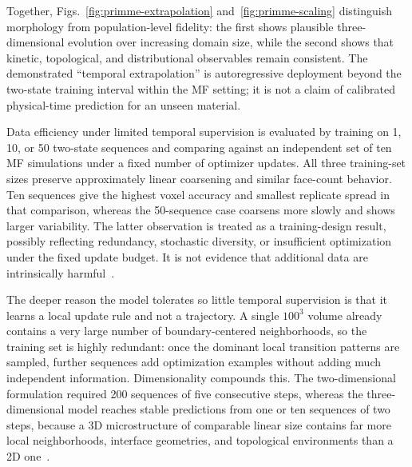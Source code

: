 \documentclass[proposalMode]{ufdissertation}
\begin{document}
Together, Figs.~\ref{fig:primme-extrapolation} and~\ref{fig:primme-scaling} distinguish morphology from population-level fidelity: the first shows plausible three-dimensional evolution over increasing domain size, while the second shows that kinetic, topological, and distributional observables remain consistent. The demonstrated ``temporal extrapolation'' is autoregressive deployment beyond the two-state training interval within the MF setting; it is not a claim of calibrated physical-time prediction for an unseen material.

Data efficiency under limited temporal supervision is evaluated by training on 1, 10, or 50 two-state sequences and comparing against an independent set of ten MF simulations under a fixed number of optimizer updates. All three training-set sizes preserve approximately linear coarsening and similar face-count behavior. Ten sequences give the highest voxel accuracy and smallest replicate spread in that comparison, whereas the 50-sequence case coarsens more slowly and shows larger variability. The latter observation is treated as a training-design result, possibly reflecting redundancy, stochastic diversity, or insufficient optimization under the fixed update budget. It is not evidence that additional data are intrinsically harmful~\cite{tian2026threeDprimme}.

The deeper reason the model tolerates so little temporal supervision is that it learns a local update rule and not a trajectory. A single \(100^3\) volume already contains a very large number of boundary-centered neighborhoods, so the training set is highly redundant: once the dominant local transition patterns are sampled, further sequences add optimization examples without adding much independent information. Dimensionality compounds this. The two-dimensional formulation required 200 sequences of five consecutive steps, whereas the three-dimensional model reaches stable predictions from one or ten sequences of two steps, because a 3D microstructure of comparable linear size contains far more local neighborhoods, interface geometries, and topological environments than a 2D one~\cite{yan2022primme,tian2026threeDprimme}.
\end{document}
